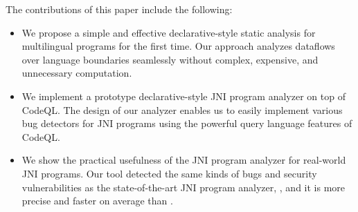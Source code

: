The contributions of this paper include the following:
\begin{itemize}
  \item We propose a simple and effective declarative-style static analysis for
    multilingual programs for the first time. Our approach analyzes dataflows
    over language boundaries seamlessly without complex, expensive,
    and unnecessary computation.

\item We implement a prototype declarative-style JNI program analyzer on top of CodeQL.
  The design of our analyzer enables us to easily implement various bug
    detectors for JNI programs using the powerful query language
    features of CodeQL. 

\item We show the practical usefulness of the JNI program analyzer for real-world
  JNI programs. Our tool detected the same kinds of bugs and security
    vulnerabilities as the state-of-the-art JNI program analyzer, \jnsaf,
and it is more precise and  faster on average than \jnsaf.
\end{itemize}
